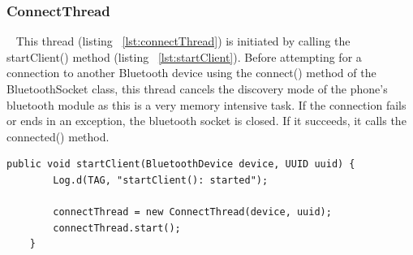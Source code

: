 \documentclass[12pt,a4paper]{article}
\begin{document}
    \subsubsection*{ConnectThread}~\cite{bib:connectThread}
    This thread (listing ~\ref{lst:connectThread}) is initiated by calling the startClient() method (listing ~\ref{lst:startClient}). Before attempting for a connection to another Bluetooth device using the connect() method of the BluetoothSocket class, this thread cancels the discovery mode of the phone's bluetooth module as this is a very memory intensive task. If the connection fails or ends in an exception, the bluetooth socket is closed. If it succeeds, it calls the connected() method.
    
    \begin{lstlisting}[label={lst:startClient}, caption=startClient() method]
    public void startClient(BluetoothDevice device, UUID uuid) {
        Log.d(TAG, "startClient(): started");

        connectThread = new ConnectThread(device, uuid);
        connectThread.start();
    }
    \end{lstlisting}
    
\end{document}
